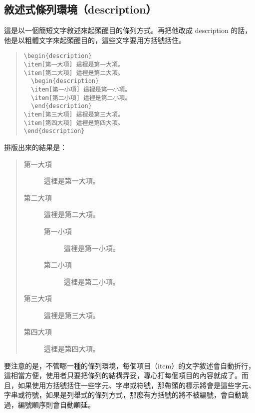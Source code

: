 \subsection{敘述式條列環境（description）}

這是以一個簡短文字敘述來起頭醒目的條列方式。再把他改成 {\ttfamily description} 的話，他是以粗體文字來起頭醒目的，這些文字要用方括號括住。

\begin{quote}
   \begin{verbatim}
\begin{description}
\item[第一大項] 這裡是第一大項。
\item[第二大項] 這裡是第二大項。
  \begin{description}
  \item[第一小項] 這裡是第一小項。
  \item[第二小項] 這裡是第二小項。
  \end{description}
\item[第三大項] 這裡是第三大項。
\item[第四大項] 這裡是第四大項。
\end{description}
\end{verbatim}
\end{quote}

排版出來的結果是：

\begin{quote}
   \begin{description}
      \item[第一大項] 這裡是第一大項。
      \item[第二大項] 這裡是第二大項。
            \begin{description}
               \item[第一小項] 這裡是第一小項。
               \item[第二小項] 這裡是第二小項。
            \end{description}
      \item[第三大項] 這裡是第三大項。
      \item[第四大項] 這裡是第四大項。
   \end{description}
\end{quote}

要注意的是，不管哪一種的條列環境，每個項目（item）的文字敘述會自動折行，這相當方便，使用者只要把條列的結構弄妥，專心打每個項目的內容就成了。而且，如果使用方括號括住一些字元、字串或符號，那帶頭的標示將會是這些字元、字串或符號，如果是列舉式的條列方式，那麼有方括號的將不被編號，會自動跳過，編號順序則會自動順延。

